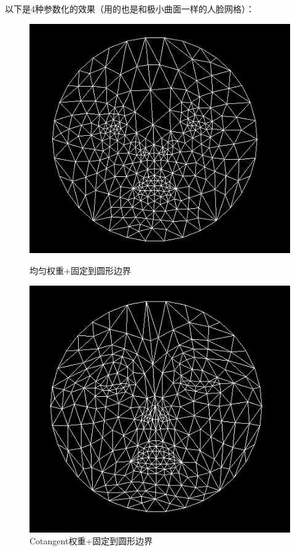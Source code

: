 \documentclass{article}
\begin{document}
	以下是4种参数化的效果（用的也是和极小曲面一样的人脸网格）：
	\begin{figure}[htbp]
		\centering
		\begin{minipage}{0.49\linewidth}
			\centering
			\includegraphics[width=0.8\linewidth]{UC.JPG}
			\caption{均匀权重+固定到圆形边界}
		\end{minipage}
		\begin{minipage}{0.49\linewidth}
			\centering
			\includegraphics[width=0.8\linewidth]{CC.JPG}
			\caption{Cotangent权重+固定到圆形边界}
		\end{minipage}
	\end{figure}
\end{document}
